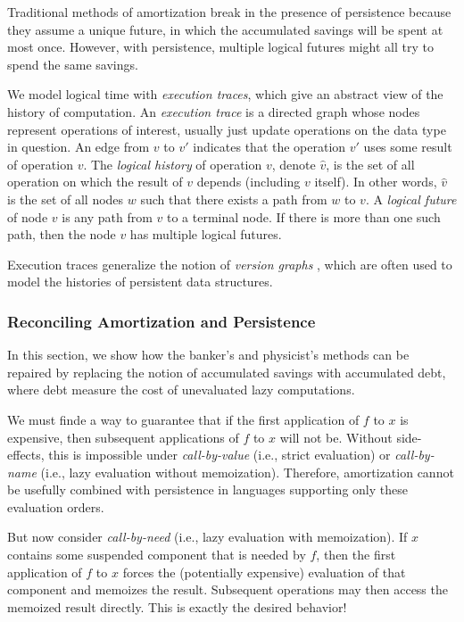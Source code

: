 \documentclass[12pt, a4paper]{article} %
\begin{document}
Traditional methods of amortization break in the presence of persistence because they assume a unique future, in which the accumulated savings will be spent at most once. However, with persistence, multiple logical futures might all try to spend the same savings.

We model logical time with \textit{execution traces}, which give an abstract view of the history of computation. An \textit{execution trace} is a directed graph whose nodes represent operations of interest, usually just update operations on the data type in question. An edge from $v$ to $v'$ indicates that the operation $v'$ uses some result of operation $v$. The \textit{logical history} of operation $v$, denote $\hat{v}$, is the set of all operation on which the result of $v$ depends (including $v$ itself). In other words, $\hat{v}$ is the set of all nodes $w$ such that there exists a path from $w$ to $v$. A \textit{logical future} of node $v$ is any path from $v$ to a terminal node. If there is more than one such path, then the node $v$ has multiple logical futures.

Execution traces generalize the notion of \textit{version graphs} \cite{dsst89}, which are often used to model the histories of persistent data structures.

\subsubsection{Reconciling Amortization and Persistence}%

In this section, we show how the banker's and physicist's methods can be repaired by replacing the notion of accumulated savings with accumulated debt, where debt measure the cost of unevaluated lazy computations.

We must finde a way to guarantee that if the first application of $f$ to $x$ is expensive, then subsequent applications of $f$ to $x$ will not be. Without side-effects, this is impossible under \mbox{\textit{call-by-value}} (i.e., strict evaluation) or \mbox{\textit{call-by-name}} (i.e., lazy evaluation without memoization). Therefore, amortization cannot be usefully combined with persistence in languages supporting only these evaluation orders.

But now consider \mbox{\textit{call-by-need}} (i.e., lazy evaluation with memoization). If $x$ contains some suspended component that is needed by $f$, then the first application of $f$ to $x$ forces the (potentially expensive) evaluation of that component and memoizes the result. Subsequent operations may then access the memoized result directly. This is exactly the desired behavior!
\end{document}
